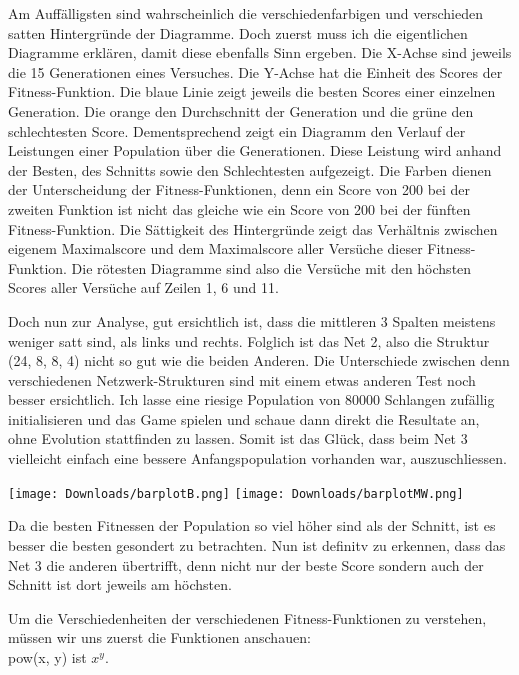\documentclass[10pt,a4paper,ngerman,english]{article}
\begin{document}
Am Auffälligsten sind wahrscheinlich die verschiedenfarbigen und verschieden satten Hintergründe der Diagramme. Doch zuerst muss ich die eigentlichen Diagramme erklären, damit diese ebenfalls Sinn ergeben. Die X-Achse sind jeweils die 15 Generationen eines Versuches. Die Y-Achse hat die Einheit des Scores der Fitness-Funktion. Die blaue Linie zeigt jeweils die besten Scores einer einzelnen Generation. Die orange den Durchschnitt der Generation und die grüne den schlechtesten Score. Dementsprechend zeigt ein Diagramm den Verlauf der Leistungen einer Population über die Generationen. Diese Leistung wird anhand der Besten, des Schnitts sowie den Schlechtesten aufgezeigt. Die Farben dienen der Unterscheidung der Fitness-Funktionen, denn ein Score von 200 bei der zweiten Funktion ist nicht das gleiche wie ein Score von 200 bei der fünften Fitness-Funktion. Die Sättigkeit des Hintergründe zeigt das Verhältnis zwischen eigenem Maximalscore und dem Maximalscore aller Versüche dieser Fitness-Funktion. Die rötesten Diagramme sind also die Versüche mit den höchsten Scores aller Versüche auf Zeilen 1, 6 und 11.

Doch nun zur Analyse, gut ersichtlich ist, dass die mittleren 3 Spalten meistens weniger satt sind, als links und rechts. Folglich ist das Net 2, also die Struktur (24, 8, 8, 4) nicht so gut wie die beiden Anderen. Die Unterschiede zwischen denn verschiedenen Netzwerk-Strukturen sind mit einem etwas anderen Test noch besser ersichtlich. Ich lasse eine riesige Population von 80000 Schlangen zufällig initialisieren und das Game spielen und schaue dann direkt die Resultate an, ohne Evolution stattfinden zu lassen. Somit ist das Glück, dass beim Net 3 vielleicht einfach eine bessere Anfangspopulation vorhanden war, auszuschliessen.

\begin{center}
    \texttt{[image: Downloads/barplotB.png]}
    \texttt{[image: Downloads/barplotMW.png]}
\end{center}

Da die besten Fitnessen der Population so viel höher sind als der Schnitt, ist es besser die besten gesondert zu betrachten. Nun ist definitv zu erkennen, dass das Net 3 die anderen übertrifft, denn nicht nur der beste Score sondern auch der Schnitt ist dort jeweils am höchsten. 

Um die Verschiedenheiten der verschiedenen Fitness-Funktionen zu verstehen, müssen wir uns zuerst die Funktionen anschauen:\\
pow(x, y) ist $x^y$.
\end{document}
